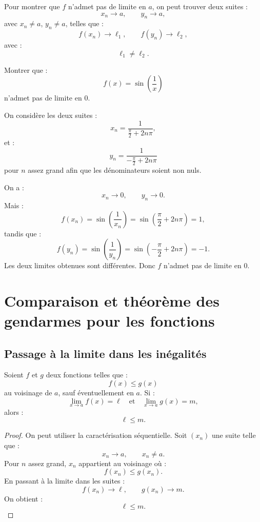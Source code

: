 \documentclass[11pt,a4paper]{article}
\begin{document}
\begin{methodbox}
Pour montrer que \(f\) n'admet pas de limite en \(a\), on peut trouver deux suites :
\[
x_n\to a,\qquad y_n\to a,
\]
avec \(x_n\neq a\), \(y_n\neq a\), telles que :
\[
f(x_n)\to\ell_1,
\qquad
f(y_n)\to\ell_2,
\]
avec :
\[
\ell_1\neq\ell_2.
\]
\end{methodbox}

\begin{exercicebox}
Montrer que :
\[
f(x)=\sin\left(\frac1x\right)
\]
n'admet pas de limite en \(0\).
\end{exercicebox}

\begin{correctionbox}
On considère les deux suites :
\[
x_n=\frac{1}{\frac{\pi}{2}+2n\pi},
\]
et :
\[
y_n=\frac{1}{-\frac{\pi}{2}+2n\pi}
\]
pour \(n\) assez grand afin que les dénominateurs soient non nuls.

On a :
\[
x_n\to0,
\qquad
y_n\to0.
\]
Mais :
\[
f(x_n)=\sin\left(\frac1{x_n}\right)
=
\sin\left(\frac{\pi}{2}+2n\pi\right)=1,
\]
tandis que :
\[
f(y_n)=\sin\left(\frac1{y_n}\right)
=
\sin\left(-\frac{\pi}{2}+2n\pi\right)=-1.
\]
Les deux limites obtenues sont différentes.  
Donc \(f\) n'admet pas de limite en \(0\).
\end{correctionbox}

\section{Comparaison et théorème des gendarmes pour les fonctions}

\subsection{Passage à la limite dans les inégalités}

\begin{theorembox}
Soient \(f\) et \(g\) deux fonctions telles que :
\[
f(x)\leq g(x)
\]
au voisinage de \(a\), sauf éventuellement en \(a\).  
Si :
\[
\lim_{x\to a}f(x)=\ell
\quad\text{et}\quad
\lim_{x\to a}g(x)=m,
\]
alors :
\[
\ell\leq m.
\]
\end{theorembox}

\begin{proof}
On peut utiliser la caractérisation séquentielle.  
Soit \((x_n)\) une suite telle que :
\[
x_n\to a,
\qquad x_n\neq a.
\]
Pour \(n\) assez grand, \(x_n\) appartient au voisinage où :
\[
f(x_n)\leq g(x_n).
\]
En passant à la limite dans les suites :
\[
f(x_n)\to \ell,
\qquad
g(x_n)\to m.
\]
On obtient :
\[
\ell\leq m.
\]
\end{proof}
\end{document}
